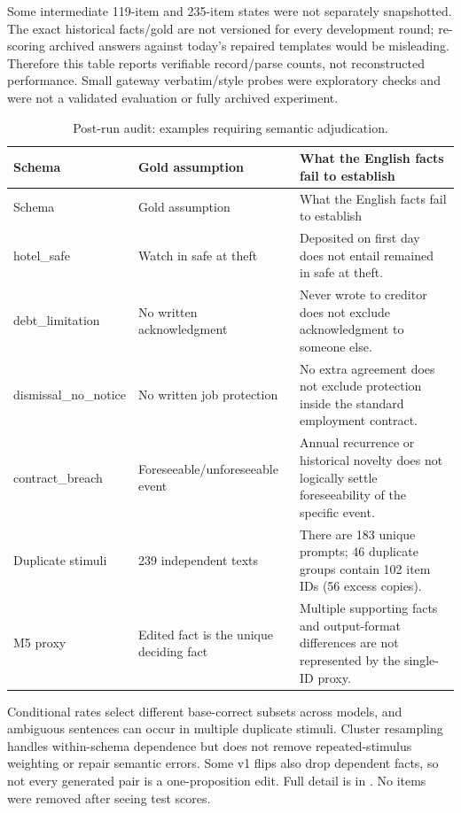 \documentclass[11pt,a4paper]{article}
\begin{document}
Some intermediate 119-item and 235-item states were not separately snapshotted. The exact historical facts/gold are not versioned for every development round; re-scoring archived answers against today's repaired templates would be misleading. Therefore this table reports verifiable record/parse counts, not reconstructed performance. Small gateway verbatim/style probes were exploratory checks and were not a validated evaluation or fully archived experiment.

\begingroup\small\setlength{\tabcolsep}{4pt}
\begin{longtable}{p{3.4cm}p{4.7cm}p{7.1cm}}
\caption{Post-run audit: examples requiring semantic adjudication.}\\
\toprule
Schema & Gold assumption & What the English facts fail to establish \\
\midrule\endfirsthead
\toprule
Schema & Gold assumption & What the English facts fail to establish \\
\midrule\endhead
\bottomrule\endfoot
hotel\_safe & Watch in safe at theft & Deposited on first day does not entail remained in safe at theft. \\
debt\_limitation & No written acknowledgment & Never wrote to creditor does not exclude acknowledgment to someone else. \\
dismissal\_no\_notice & No written job protection & No extra agreement does not exclude protection inside the standard employment contract. \\
contract\_breach & Foreseeable/unforeseeable event & Annual recurrence or historical novelty does not logically settle foreseeability of the specific event. \\
Duplicate stimuli & 239 independent texts & There are 183 unique prompts; 46 duplicate groups contain 102 item IDs (56 excess copies). \\
M5 proxy & Edited fact is the unique deciding fact & Multiple supporting facts and output-format differences are not represented by the single-ID proxy. \\
\end{longtable}\endgroup


Conditional rates select different base-correct subsets across models, and ambiguous sentences can occur in multiple duplicate stimuli. Cluster resampling handles within-schema dependence but does not remove repeated-stimulus weighting or repair semantic errors. Some v1 flips also drop dependent facts, so not every generated pair is a one-proposition edit. Full detail is in . No items were removed after seeing test scores.
\end{document}
